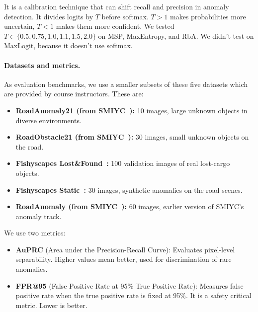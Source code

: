 It is a calibration technique that can shift recall and precision in anomaly detection.
It divides logits by $T$ before softmax. $T > 1$ makes probabilities more uncertain, $T < 1$ makes them more confident. 
We tested $T \in \{0.5, 0.75, 1.0, 1.1, 1.5, 2.0\}$ on MSP, MaxEntropy, and RbA. We didn't test on MaxLogit, because it doesn't use softmax.

\paragraph{Datasets and metrics.}

As evaluation benchmarks, we use a smaller subsets of these five datasets which are provided by course instructors. These are:

\begin{itemize}
    
    \item \textbf{RoadAnomaly21 (from SMIYC~\cite{smiyc}):} 10 images, large unknown objects in diverse environments.
    \item \textbf{RoadObstacle21 (from SMIYC~\cite{smiyc}):} 30 images, small unknown objects on the road.
    \item \textbf{Fishyscapes Lost\&Found~\cite{fishyscapes}:} 100 validation images of real lost-cargo objects.
    \item \textbf{Fishyscapes Static~\cite{fishyscapes}:} 30 images, synthetic anomalies on the road scenes.
    \item \textbf{RoadAnomaly (from SMIYC~\cite{smiyc}):} 60 images, earlier version of SMIYC's anomaly track.     

\end{itemize}
We use two metrics:
\begin{itemize}
    \item \textbf{AuPRC} (Area under the Precision-Recall Curve): Evaluates pixel-level separability. Higher values mean better, used for discrimination of rare anomalies.
    \item \textbf{FPR@95} (False Positive Rate at 95\% True Positive Rate): Measures false positive rate when the true positive rate is fixed at 95\%. It is a safety critical metric. Lower is better.
\end{itemize}
